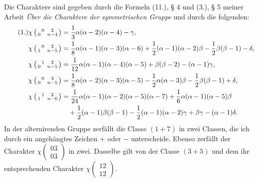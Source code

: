 \documentclass[11pt]{article}
\newcommand{\ch}[2]{\left(\begin{smallmatrix}#1\\#2\end{smallmatrix}\right)}
\begin{document}
Die Charaktere sind gegeben durch die Formeln (11.), § 4 und (3.), § 5 meiner Arbeit \emph{Über die Charaktere der symmetrischen Gruppe} und durch die folgenden:
\begin{align}\tag{1.}
 \chi\ch{0\quad 2}{0\quad n-4}&=\frac13\alpha(\alpha-2)(\alpha-4)-\gamma,\\
 \chi\ch{0\quad 2}{1\quad n-5}&=\frac18\alpha(\alpha-1)(\alpha-3)(\alpha-6)+\frac12(\alpha-1)(\alpha-2)\beta-\frac12\beta(\beta-1)-\delta,\\
 \chi\ch{1\quad 2}{0\quad n-5}&=\frac1{12}\alpha(\alpha-1)(\alpha-4)(\alpha-5)+\beta(\beta-2)-(\alpha-1)\gamma,\\
 \chi\ch{0\quad 3}{0\quad n-5}&=\frac18\alpha(\alpha-2)(\alpha-3)(\alpha-5)-\frac12\alpha(\alpha-3)\beta-\frac12\beta(\beta-1)+\delta,\\
 \chi\ch{1\quad 2}{1\quad n-6}&=\frac1{24}\alpha(\alpha-1)(\alpha-2)(\alpha-5)(\alpha-7)+\frac16\alpha(\alpha-1)(\alpha-5)\beta\notag\\
 &\quad+\frac12(\alpha-1)\beta(\beta-1)-\frac12(\alpha-1)(\alpha-2)\gamma+\beta\gamma-(\alpha-1)\delta.
\end{align}
In der alternirenden Gruppe zerfällt die Classe $(1+7)$ in zwei Classen, die ich durch ein angehängtes Zeichen $+$ oder $-$ unterscheide. Ebenso zerfällt der Charakter $\chi\ch{03}{03}$ in zwei. Dasselbe gilt von der Classe $(3+5)$ und dem ihr entsprechenden Charakter $\chi\ch{12}{12}$.
\end{document}
